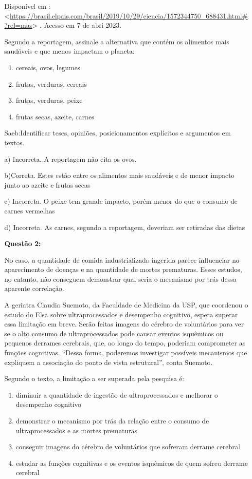 Disponível em
:\textless{}\href{https://brasil.elpais.com/brasil/2019/10/29/ciencia/1572344750_688431.html\#?rel=mas}{{https://brasil.elpais.com/brasil/2019/10/29/ciencia/1572344750\_688431.html\#?rel=mas}}\textgreater{}
. Acesso em 7 de abri 2023.

Segundo a reportagem, assinale a alternativa que contém os alimentos
mais saudáveis e que menos impactam o planeta:

\begin{enumerate}
\def\labelenumi{\alph{enumi})}
\item
  cereais, ovos, legumes
\item
  frutas, verduras, cereais
\item
  frutas, verduras, peixe
\item
  frutas secas, azeite, carnes
\end{enumerate}

Saeb:Identificar teses, opiniões, posicionamentos explícitos e
argumentos em textos.

a) Incorreta. A reportagem não cita os ovos.

b)Correta. Estes estão entre os alimentos mais saudáveis e de menor
impacto junto ao azeite e frutas secas

c) Incorreta. O peixe tem grande impacto, porém menor do que o consumo
de carnes vermelhas

d) Incorreta. As carnes, segundo a reportagem, deveriam ser retiradas
das dietas

\textbf{Questão 2:}

No caso, a quantidade de comida industrializada ingerida parece
influenciar no aparecimento de doenças e na quantidade de mortes
prematuras. Esses estudos, no entanto, não conseguem demonstrar qual
seria o mecanismo por trás dessa aparente correlação.

A geriatra Claudia Suemoto, da Faculdade de Medicina da USP, que
coordenou o estudo do Elsa sobre ultraprocessados e desempenho
cognitivo, espera superar essa limitação em breve. Serão feitas imagens
do cérebro de voluntários para ver se o alto consumo de ultraprocessados
pode causar eventos isquêmicos ou pequenos derrames cerebrais, que, ao
longo do tempo, poderiam comprometer as funções cognitivas. ``Dessa
forma, poderemos investigar possíveis mecanismos que expliquem a
associação do ponto de vista estrutural'', conta Suemoto.

Segundo o texto, a limitação a ser superada pela pesquisa é:

\begin{enumerate}
\def\labelenumi{\alph{enumi})}
\item
  diminuir a quantidade de ingestão de ultraprocessados e melhorar o
  desempenho cognitivo
\item
  demonstrar o mecanismo por trás da relação entre o consumo de
  ultraprocessados e as mortes prematuras
\item
  conseguir imagens do cérebro de voluntários que sofreram derrame
  cerebral
\item
  estudar as funções cognitivas e os eventos isquêmicos de quem sofreu
  derrame cerebral
\end{enumerate}

